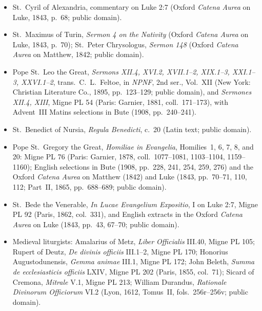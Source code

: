 \begin{itemize}
Christian Literature Co., 1886, pp.~127--128, 465); \textit{Tractates on the
Gospel of John}, IV.1, 7, in \textit{NPNF}, 1st ser., Vol.~VII (New York, 1888,
pp.~25, 27--28); \textit{Expositions on the Psalms}, Ps~24.1--2 and Ps~37.13,
in \textit{NPNF}, 1st ser., Vol.~VIII (New York, 1888, pp.~106--107);
\textit{Sermones CLXXXV.1} and \textit{CXCI.1}, Migne PL 38 (Paris, 1845,
coll.~997--998, 1009--1010; public domain).
\item St.~Cyril of Alexandria, commentary on Luke 2:7 (Oxford \textit{Catena
Aurea} on Luke, 1843, p.~68; public domain).
\item St.~Maximus of Turin, \textit{Sermon 4 on the Nativity} (Oxford
\textit{Catena Aurea} on Luke, 1843, p.~70); St.~Peter Chrysologus,
\textit{Sermon 148} (Oxford \textit{Catena Aurea} on Matthew, 1842; public
domain).
\item Pope St.~Leo the Great, \textit{Sermons XII.4, XVI.2, XVII.1--2,
XIX.1--3, XXI.1--3, XXVI.1--2}, trans.\ C.~L.~Feltoe, in \textit{NPNF},
2nd ser., Vol.~XII (New York: Christian Literature Co., 1895, pp.~123--129;
public domain), and \textit{Sermones XII.4, XIII}, Migne PL 54 (Paris: Garnier,
1881, coll.~171--173), with Advent~III Matins selections in Bute (1908,
pp.~240--241).
\item St.~Benedict of Nursia, \textit{Regula Benedicti}, c.~20 (Latin text;
public domain).
\item Pope St.~Gregory the Great, \textit{Homiliae in Evangelia}, Homilies~1,
6, 7, 8, and 20: Migne PL 76 (Paris: Garnier, 1878, coll.~1077--1081,
1103--1104, 1159--1160); English selections in Bute (1908, pp.~228, 241, 254,
259, 276) and the Oxford \textit{Catena Aurea} on Matthew (1842) and Luke
(1843, pp.~70--71, 110, 112; Part~II, 1865, pp.~688--689; public domain).
\item St.~Bede the Venerable, \textit{In Lucae Evangelium Expositio}, I on
Luke 2:7, Migne PL 92 (Paris, 1862, col.~331), and English extracts in the
Oxford \textit{Catena Aurea} on Luke (1843, pp.~43, 67--70; public domain).
\item Medieval liturgists: Amalarius of Metz, \textit{Liber Officialis} III.40,
Migne PL 105; Rupert of Deutz, \textit{De divinis officiis} III.1--2, Migne PL
170; Honorius Augustodunensis, \textit{Gemma animae} III.1, Migne PL 172;
John Beleth, \textit{Summa de ecclesiasticis officiis} LXIV, Migne PL 202
(Paris, 1855, col.~71); Sicard of Cremona, \textit{Mitrale} V.1, Migne PL 213;
William Durandus, \textit{Rationale Divinorum Officiorum} VI.2 (Lyon, 1612,
Tomus~II, fols.~256r--256v; public domain).

\end{itemize}
